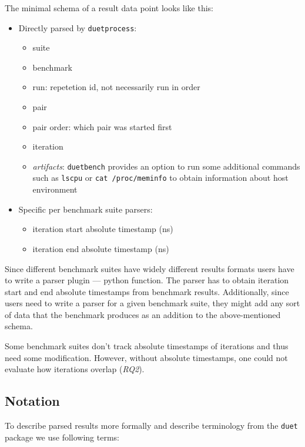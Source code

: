 The minimal schema of a result data point looks like this:
\begin{itemize}
    \item Directly parsed by \lstinline{duetprocess}:
        \begin{itemize}
            \item suite
            \item benchmark
            \item run: repetetion id, not necessarily run in order
            \item pair
            \item pair order: which pair was started first
            \item iteration
            \item \emph{artifacts}: \lstinline{duetbench} provides an option to run some additional commands such as \lstinline{lscpu} or \lstinline{cat /proc/meminfo} to obtain information about host environment
        \end{itemize}
    \item Specific per benchmark suite parsers:
        \begin{itemize}
            \item iteration start absolute timestamp (ns)
            \item iteration end absolute timestamp (ns)
        \end{itemize}
\end{itemize}

Since different benchmark suites have widely different results formats users have to write a parser plugin --- python function.
The parser has to obtain iteration start and end absolute timestamps from benchmark results. 
Additionally, since users need to write a parser for a given benchmark suite, they might add any sort of data that the benchmark produces as an addition to the above-mentioned schema.

Some benchmark suites don't track absolute timestamps of iterations and thus need some modification.
However, without absolute timestamps, one could not evaluate how iterations overlap (\emph{RQ2}).

\subsection{Notation}
\label{sec:notation}

To describe parsed results more formally and describe terminology from the \lstinline{duet} package we use following terms:

